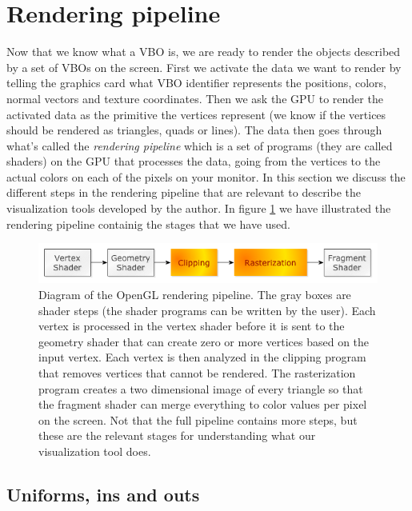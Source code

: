 \section{Rendering pipeline}
\label{sec:opengl_rendering_pipeline}
Now that we know what a VBO is, we are ready to render the objects described by a set of VBOs on the screen. First we activate the data we want to render by telling the graphics card what VBO identifier represents the positions, colors, normal vectors and texture coordinates. Then we ask the GPU to render the activated data as the primitive the vertices represent (we know if the vertices should be rendered as triangles, quads or lines). The data then goes through what's called the \textit{rendering pipeline} which is a set of programs (they are called shaders) on the GPU that processes the data, going from the vertices to the actual colors on each of the pixels on your monitor. In this section we discuss the different steps in the rendering pipeline that are relevant to describe the visualization tools developed by the author. In figure \ref{fig:opengl_rendering_pipeline} we have illustrated the rendering pipeline containig the stages that we have used. 
\begin{figure}[h]
\begin{center}
\includegraphics[width=\textwidth, trim=0cm 0cm 0cm 0cm, clip]{opengl/figures/pipeline.png}
\end{center}
\caption{Diagram of the OpenGL rendering pipeline. The gray boxes are shader steps (the shader programs can be written by the user). Each vertex is processed in the vertex shader before it is sent to the geometry shader that can create zero or more vertices based on the input vertex. Each vertex is then analyzed in the clipping program that removes vertices that cannot be rendered. The rasterization program creates a two dimensional image of every triangle so that the fragment shader can merge everything to color values per pixel on the screen. Not that the full pipeline contains more steps, but these are the relevant stages for understanding what our visualization tool does.}
\label{fig:opengl_rendering_pipeline}
\end{figure}
\subsection{Uniforms, ins and outs}
\label{sec:opengl_uniforms}
